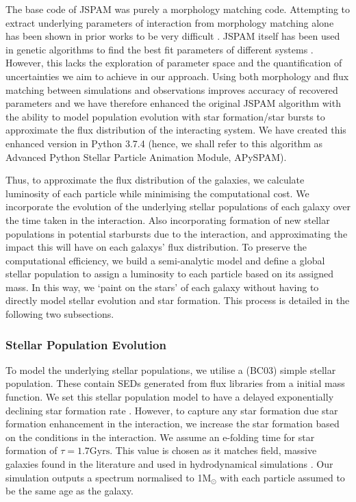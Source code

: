 The base code of JSPAM was purely a morphology matching code. Attempting to extract underlying parameters of interaction from morphology matching alone has been shown in prior works to be very difficult \citep[e.g.][]{2009AJ....137.3071B}. JSPAM itself has been used in genetic algorithms to find the best fit parameters of different systems \citep[e.g][]{2023A&C....4200691W}. However, this lacks the exploration of parameter space and the quantification of uncertainties we aim to achieve in our approach. Using both morphology and flux matching between simulations and observations improves accuracy of recovered parameters \citep{2021ApJ...923..124M} and we have therefore enhanced the original JSPAM algorithm with the ability to model population evolution with star formation/star bursts to approximate the flux distribution of the interacting system. We have created this enhanced version in Python 3.7.4 (hence, we shall refer to this algorithm as Advanced Python Stellar Particle Animation Module, APySPAM).

Thus, to approximate the flux distribution of the galaxies, we calculate luminosity of each particle while minimising the computational cost. We incorporate the evolution of the underlying stellar populations of each galaxy over the time taken in the interaction. Also incorporating formation of new stellar populations in potential starbursts due to the interaction, and approximating the impact this will have on each galaxys' flux distribution. To preserve the computational efficiency, we build a semi-analytic model and define a global stellar population to assign a luminosity to each particle based on its assigned mass. In this way, we `paint on the stars' of each galaxy without having to directly model stellar evolution and star formation. This process is detailed in the following two subsections. 

\subsubsection{Stellar Population Evolution}\label{Stellar_Pop_Evol}
To model the underlying stellar populations, we utilise a \citet{2003MNRAS.344.1000B} (BC03) simple stellar population. These contain SEDs generated from flux libraries from a \citet{2003PASP..115..763C} initial mass function. We set this stellar population model to have a delayed exponentially declining star formation rate \citep{2009ApJ...690..802J, 2013ApJ...762L..15P,2014arXiv1404.0402S, 2019A&A...622A.103B}. However, to capture any star formation due star formation enhancement in the interaction, we increase the star formation based on the conditions in the interaction. We assume an e-folding time for star formation of $\tau = 1.7\text{Gyrs}$. This value is chosen as it matches field, massive galaxies found in the literature \citep[e.g][]{2010ApJ...721..193P} and used in hydrodynamical simulations \citep[e.g.][]{2022ApJ...941....5J}. Our simulation outputs a spectrum normalised to 1M$_{\odot}$ with each particle assumed to be the same age as the galaxy.

